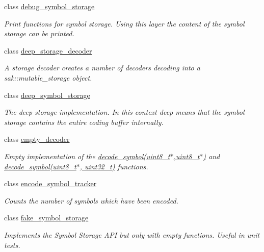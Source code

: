 \begin{DoxyCompactItemize}
class \hyperlink{classkodo_1_1debug__symbol__storage}{debug\-\_\-symbol\-\_\-storage}
\begin{DoxyCompactList}\small\item\em Print functions for symbol storage. Using this layer the content of the symbol storage can be printed. \end{DoxyCompactList}\item 
class \hyperlink{classkodo_1_1deep__storage__decoder}{deep\-\_\-storage\-\_\-decoder}
\begin{DoxyCompactList}\small\item\em A storage decoder creates a number of decoders decoding into a sak\-::mutable\-\_\-storage object. \end{DoxyCompactList}\item 
class \hyperlink{classkodo_1_1deep__symbol__storage}{deep\-\_\-symbol\-\_\-storage}
\begin{DoxyCompactList}\small\item\em The deep storage implementation. In this context deep means that the symbol storage contains the entire coding buffer internally. \end{DoxyCompactList}\item 
class \hyperlink{classkodo_1_1empty__decoder}{empty\-\_\-decoder}
\begin{DoxyCompactList}\small\item\em Empty implementation of the \hyperlink{classkodo_1_1empty__decoder_aa700bffb25d17e3e2c819d36ed61308a}{decode\-\_\-symbol(uint8\-\_\-t$\ast$,uint8\-\_\-t$\ast$)} and \hyperlink{classkodo_1_1empty__decoder_aac8f8c663ddeaf9700d1a0fc50674462}{decode\-\_\-symbol(uint8\-\_\-t$\ast$, uint32\-\_\-t)} functions. \end{DoxyCompactList}\item 
class \hyperlink{classkodo_1_1encode__symbol__tracker}{encode\-\_\-symbol\-\_\-tracker}
\begin{DoxyCompactList}\small\item\em Counts the number of symbols which have been encoded. \end{DoxyCompactList}\item 
class \hyperlink{classkodo_1_1fake__symbol__storage}{fake\-\_\-symbol\-\_\-storage}
\begin{DoxyCompactList}\small\item\em Implements the Symbol Storage A\-P\-I but only with empty functions. Useful in unit tests. \end{DoxyCompactList}\item 

\end{DoxyCompactItemize}
